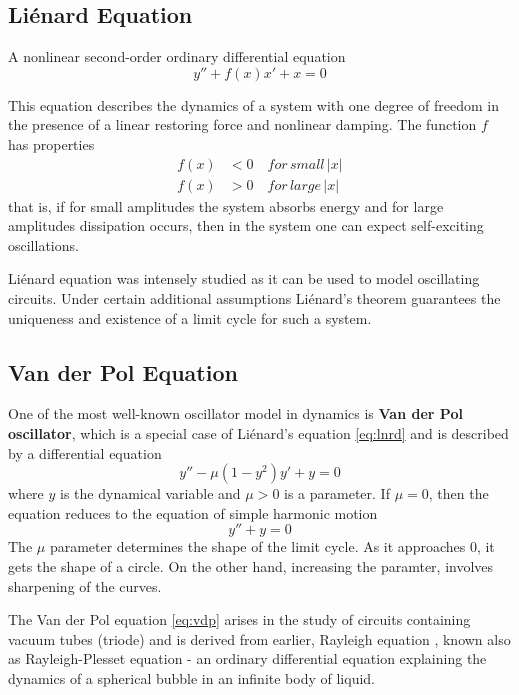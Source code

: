 \documentclass[journal]{IEEEtran}
\begin{document}
\subsection{Li\'{e}nard Equation}
A nonlinear second-order ordinary differential equation
\begin{equation}
\label{eq:lnrd}
y''+f(x)x'+x=0
\end{equation}

This equation describes the dynamics of a system with one degree of freedom in the presence of a linear restoring force and nonlinear damping. The function $f$ has properties
\begin{align*}
f(x)&<0\quad for\,small\,|x| \\
f(x)&>0\quad for\,large\,|x|
\end{align*}
that is, if for small amplitudes the system absorbs energy and for large amplitudes dissipation occurs, then in the system one can expect self-exciting oscillations.

Li\'{e}nard equation was intensely studied as it can be used to model oscillating circuits. Under certain additional assumptions Li\'{e}nard's theorem guarantees the uniqueness and existence of a limit cycle for such a system.

\subsection{Van der Pol Equation}
One of the most well-known oscillator model in dynamics is \textbf{Van der Pol oscillator}, which is a special case of Li\'{e}nard's equation \eqref{eq:lnrd} and is described by a differential equation
\begin{equation}
\label{eq:vdp}
y''-\mu\left(1-y^2\right)y'+y=0
\end{equation}
where $y$ is the dynamical variable and $\mu>0$ is a parameter. If $\mu=0$, then the equation reduces to the equation of simple harmonic motion
$$y''+y=0$$
The $\mu$ parameter determines the shape of the limit cycle. As it approaches 0, it gets the shape of a circle. On the other hand, increasing the paramter, involves sharpening of the curves.

The Van der Pol equation \eqref{eq:vdp} arises in the study of circuits containing vacuum tubes (triode) and is derived from earlier, Rayleigh equation \cite{nahin2001science}, known also as Rayleigh-Plesset equation - an ordinary differential equation explaining the dynamics of a spherical bubble in an infinite body of liquid.
\end{document}
